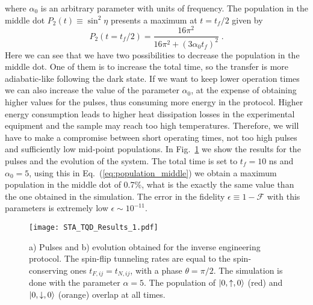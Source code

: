 where $\alpha_0$ is an arbitrary parameter with units of frequency. The population in the middle dot $P_2(t)\equiv \sin^2\eta$ presents a maximum at $t=t_f/2$ given by
\begin{equation}
	P_2(t=t_f/2)=\frac{16\pi^2}{16\pi^2+(3\alpha_0t_f)^2}\; .
	\label{eq:population_middle}
\end{equation}
Here we can see that we have two possibilities to decrease the population in the middle dot. One of them is to increase the total time, so the transfer is more adiabatic-like following the dark state. If we want to keep lower operation times we can also increase the value of the parameter $\alpha_0$, at the expense of obtaining higher values for the pulses, thus consuming more energy in the protocol. Higher energy consumption leads to higher heat dissipation losses in the experimental equipment and the sample may reach too high temperatures. Therefore, we will have to make a compromise between short operating times, not too high pulses and sufficiently low mid-point populations. In Fig.~\ref{fig:STA_TQD_Results_1} we show the results for the pulses and the evolution of the system. The total time is set to $t_f=10$ ns and $\alpha_0=5$, using this in Eq.~(\ref{eq:population_middle}) we obtain a maximum population in the middle dot of 0.7\%, what is the exactly the same value than the one obtained in the simulation. The error in the fidelity $\epsilon\equiv 1-\mathcal{F}$ with this parameters is extremely low $\epsilon\sim 10^{-11}$.
\begin{figure}[!htb]
	\centering
	\texttt{[image: STA\_TQD\_Results\_1.pdf]}
	\caption{a) Pulses and b) evolution obtained for the inverse engineering protocol. The spin-flip tunneling rates are equal to the spin-conserving ones $t_{F,ij}=t_{N,ij}$, with a phase $\theta=\pi/2$. The simulation is done with the parameter $\alpha=5$. The population of $\ket{0,\uparrow,0}$ (red) and $\ket{0,\downarrow,0}$ (orange) overlap at all times.}
	\label{fig:STA_TQD_Results_1}
\end{figure}

